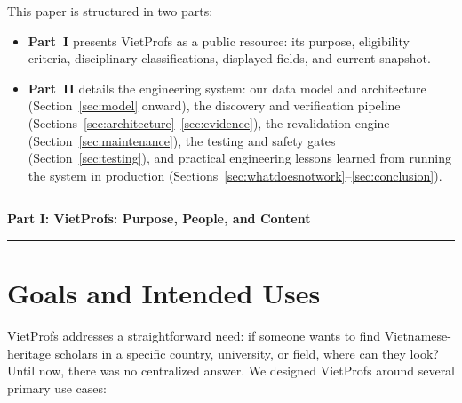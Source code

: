 \documentclass[11pt]{article}
\begin{document}
This paper is structured in two parts:
\begin{itemize}
\item \textbf{Part~I} presents VietProfs as a public resource: its purpose, eligibility criteria, disciplinary classifications, displayed fields, and current snapshot.
\item \textbf{Part~II} details the engineering system: our data model and architecture (Section~\ref{sec:model} onward), the discovery and verification pipeline (Sections~\ref{sec:architecture}--\ref{sec:evidence}), the revalidation engine (Section~\ref{sec:maintenance}), the testing and safety gates (Section~\ref{sec:testing}), and practical engineering lessons learned from running the system in production (Sections~\ref{sec:whatdoesnotwork}--\ref{sec:conclusion}).
\end{itemize}

\begin{center}
\setlength{\fboxsep}{6pt}
\setlength{\fboxrule}{0.5pt}
\end{center}

\vspace{0.6em}
\noindent\rule{\linewidth}{0.4pt}
\begin{center}
{\Large\textbf{Part I: VietProfs: Purpose, People, and Content}}
\end{center}
\noindent\rule{\linewidth}{0.4pt}
\vspace{0.4em}

\section{Goals and Intended Uses}
\label{sec:goals}
VietProfs addresses a straightforward need: if someone wants to find Vietnamese-heritage scholars in a specific country, university, or field, where can they look?
Until now, there was no centralized answer.
We designed VietProfs around several primary use cases:
\end{document}
